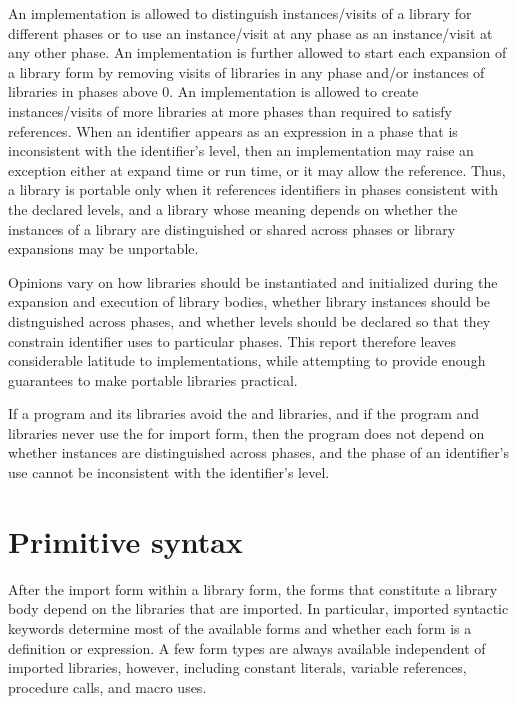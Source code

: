 An implementation is allowed to distinguish instances/visits of a library for
different phases or to use an instance/visit at any phase as an instance/visit at
any other phase. An implementation is further allowed to start each
expansion of a {\cf library} form by removing
visits of libraries in any phase and/or instances of
libraries in phases above $0$. An implementation is allowed to
create instances/visits of more libraries at more phases than required to
satisfy references. When an identifier appears as an expression in a
phase that is inconsistent with the identifier's level, then an
implementation may raise an exception either at expand time or run
time, or it may allow the reference. Thus, a library is portable only
when it references identifiers in phases consistent with the declared
levels, and a library whose meaning depends on whether the
instances of a library are distinguished or shared across phases or
{\cf library} expansions may be unportable.

\begin{rationale} 
Opinions vary on how libraries should be instantiated and
initialized during the expansion and execution of library bodies,
whether library instances should be distnguished across phases,
and whether levels should be declared so that they constrain 
identifier uses to particular phases. This report therefore leaves
considerable latitude to implementations, while attempting to
provide enough guarantees to make portable libraries practical.
\end{rationale} 

\begin{note}
If a program and its libraries avoid the \thersixlibrary{}
and  libraries, and if the program and libraries
never use the {\cf for} import form, then the program does not depend
on whether instances are distinguished across phases, and the phase of
an identifier's use cannot be inconsistent with the identifier's level.
\end{note} 

\section{Primitive syntax}

After the {\cf import} form within a {\cf library} form, the forms
that constitute a library body depend on the libraries that are
imported. In particular, imported syntactic keywords determine most
of the available forms and whether each form is a 
definition or expression. A few form types are
always available independent of imported libraries, however,
including constant literals, variable references, procedure calls,
 and macro uses.

